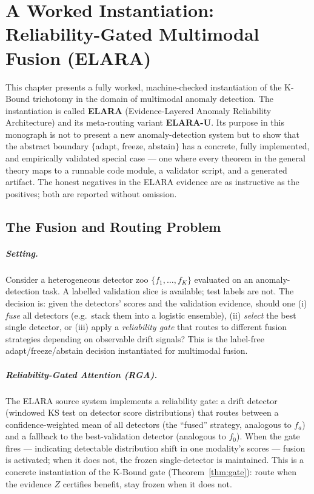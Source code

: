\chapter{A Worked Instantiation: Reliability-Gated Multimodal Fusion (ELARA)}\label{ch:elara}

This chapter presents a fully worked, machine-checked instantiation of the K-Bound
trichotomy in the domain of multimodal anomaly detection.  The instantiation is
called \textbf{ELARA} (Evidence-Layered Anomaly Reliability Architecture) and its
meta-routing variant \textbf{ELARA-U}.  Its purpose in this monograph is not to
present a new anomaly-detection system but to show that the abstract boundary
$\{$adapt, freeze, abstain$\}$ has a concrete, fully implemented, and empirically
validated special case --- one where every theorem in the general theory maps to a
runnable code module, a validator script, and a generated artifact.  The honest
negatives in the ELARA evidence are as instructive as the positives; both are
reported without omission.

\section{The Fusion and Routing Problem}\label{sec:elara-problem}

\paragraph{Setting.}
Consider a heterogeneous detector zoo $\{f_1, \ldots, f_K\}$ evaluated on an
anomaly-detection task.  A labelled validation slice is available; test labels are
not.  The decision is: given the detectors' scores and the validation evidence,
should one (i) \emph{fuse} all detectors (e.g.\ stack them into a logistic ensemble),
(ii) \emph{select} the best single detector, or (iii) apply a \emph{reliability
gate} that routes to different fusion strategies depending on observable drift
signals?  This is the label-free adapt/freeze/abstain decision instantiated for
multimodal fusion.

\paragraph{Reliability-Gated Attention (RGA).}
The ELARA source system implements a reliability gate: a drift detector
(windowed KS test on detector score distributions) that routes between a
confidence-weighted mean of all detectors (the ``fused'' strategy, analogous to
$f_a$) and a fallback to the best-validation detector (analogous to $f_0$).  When
the gate fires --- indicating detectable distribution shift in one modality's
scores --- fusion is activated; when it does not, the frozen single-detector is
maintained.  This is a concrete instantiation of the K-Bound gate
(Theorem~\ref{thm:gate}): route when the evidence $Z$ certifies benefit, stay
frozen when it does not.

